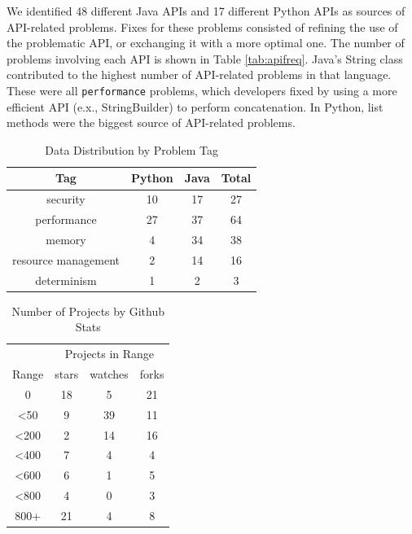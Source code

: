 \documentclass[sigconf]{acmart}
\begin{document}
We identified 48 different Java APIs and 17 different Python APIs as sources of API-related problems. Fixes for these problems consisted of refining the use of the problematic API, or exchanging it with a more optimal one. The number of problems involving each API is shown in Table \ref{tab:apifreq}. Java's String class contributed to the highest number of API-related problems in that language. These were all \texttt{performance} problems, which developers fixed by using a more efficient API (e.x., StringBuilder) to perform concatenation. In Python, list methods were the biggest source of API-related problems.
\begin{table}
  \caption{Data Distribution by Problem Tag}
  \label{tab:tag}
\begin{tabular}{  c c c c }
  \toprule
  Tag  				&Python &Java & Total\\
  \midrule
  security				& 10 &17 &27 \\
  performance			&27 &37 &64 \\
  memory				& 4 &34 &38 \\
  resource management	& 2 & 14&  16 \\
  determinism			& 1 & 2  & 3  \\
  \bottomrule
\end{tabular}
\end{table}

\begin{table}
  \caption{Number of Projects by Github Stats}
  \label{tab:domain}
\begin{tabular}{ c c c c }
  \toprule
   & \multicolumn{3}{c}{Projects in Range} \\
   \cline{2-4}
  Range & stars & watches & forks\\
  \midrule
  0			&18 & 5& 21\\
  <50		&9 &39& 11\\
  <200	    & 2 & 14& 16\\
  <400	    & 7 & 4&  4\\
  <600   	& 6 & 1&  5\\
  <800      & 4 & 0&  3\\
  800+      & 21& 4&  8\\
  \bottomrule
\end{tabular}
\end{table}
\end{document}

